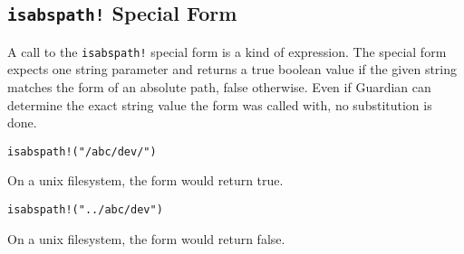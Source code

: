 
\subsection{\texttt{isabspath!} Special Form}
{
	A call to the \texttt{isabspath!} special form is a kind of expression.
	The special form expects one string parameter and returns a true boolean
	value if the given string matches the form of an absolute path, false
	otherwise.
	Even if Guardian can determine the exact string value the form was
	called with, no substitution is done.
	
	\begin{itemize}
	{
		\item \texttt{isabspath!("/abc/dev/")}
		
			On a unix filesystem, the form would return true.
		
		\item \texttt{isabspath!("../abc/dev")}
		
			On a unix filesystem, the form would return false.
	}
	\end{itemize}
}
